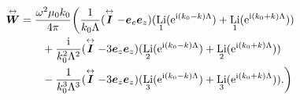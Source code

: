 \documentclass[hyperref, a4paper]{article}
\newcommand*{\ii}{\mathrm{i}}
\newcommand*{\ee}{\mathrm{e}}
\DeclareMathOperator{\li}{Li}
\renewcommand{\tensor}[1]{ \stackrel{\leftrightarrow}{\vb*{#1}}}
\begin{document}
\begin{equation}
    \begin{aligned}
        \tensor{\vb*{W}} &= \frac{\omega^2 \mu_0 k_0}{4 \pi} \biggl(
        \frac{1}{k_0 \Lambda} (\tensor{\vb*{I}} - \vb*{e}_e \vb*{e}_z) (\li_1(\ee^{\ii (k_0 - k) \Lambda}) + \li_1(\ee^{\ii (k_0 + k) \Lambda})) \\
        &\quad \quad + \frac{\ii}{k_0^2 \Lambda^2} (\tensor{\vb*{I}} - 3 \vb*{e}_z \vb*{e}_z) (\li_2(\ee^{\ii (k_0 - k) \Lambda}) + \li_2(\ee^{\ii (k_0 + k) \Lambda})) \\
        &\quad \quad - \frac{1}{k_0^3 \Lambda^3} (\tensor{\vb*{I}} - 3 \vb*{e}_z \vb*{e}_z) (\li_3(\ee^{\ii (k_0 - k) \Lambda}) + \li_3(\ee^{\ii (k_0 + k) \Lambda})).
        \biggr)
    \end{aligned}
    \label{eq:w-explicit}
\end{equation}

\paragraph{}
\end{document}
